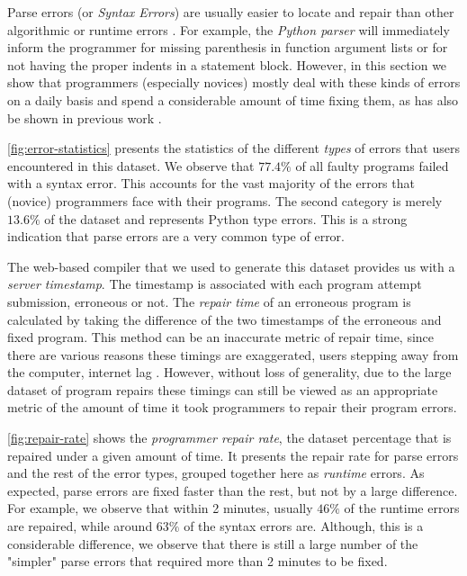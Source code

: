 Parse errors (or \emph{Syntax Errors}) are usually easier to locate and repair
than other algorithmic or runtime errors \citep{Denny_2012}. For example, the
\emph{Python parser} will immediately inform the programmer for missing
parenthesis in function argument lists or for not having the proper indents in a
statement block. However, in this section we show that programmers (especially
novices) mostly deal with these kinds of errors on a daily basis and spend a
considerable amount of time fixing them, as has also be shown in previous work
\citep{Ahadi_2018, Kummerfeld2003}.

\autoref{fig:error-statistics} presents the statistics of the different
\emph{types} of errors that users encountered in this dataset. We observe that
$77.4 \% $ of all faulty programs failed with a syntax error. This accounts for
the vast majority of the errors that (novice) programmers face with their
programs. The second category is merely $13.6\%$ of the dataset and represents
Python type errors. This is a strong indication that parse errors are a very
common type of error.

The web-based compiler that we used to generate this dataset provides us with a
\emph{server timestamp}. The timestamp is associated with each program attempt
submission, erroneous or not. The \emph{repair time} of an erroneous program is
calculated by taking the difference of the two timestamps of the erroneous and
fixed program. This method can be an inaccurate metric of repair time, since
there are various reasons these timings are exaggerated, \eg users stepping away
from the computer, internet lag \etc. However, without loss of generality, due
to the large dataset of program repairs these timings can still be viewed as an
appropriate metric of the amount of time it took programmers to repair their
program errors.

\autoref{fig:repair-rate} shows the \emph{programmer repair rate}, \ie the
dataset percentage that is repaired under a given amount of time. It presents
the repair rate for parse errors and the rest of the error types, grouped
together here as \emph{runtime} errors. As expected, parse errors are fixed
faster than the rest, but not by a large difference. For example, we observe
that within 2 minutes, usually $46\%$ of the runtime errors are repaired, while
around $63\%$ of the syntax errors are. Although, this is a considerable
difference, we observe that there is still a large number of the "simpler" parse
errors that required more than 2 minutes to be fixed.

